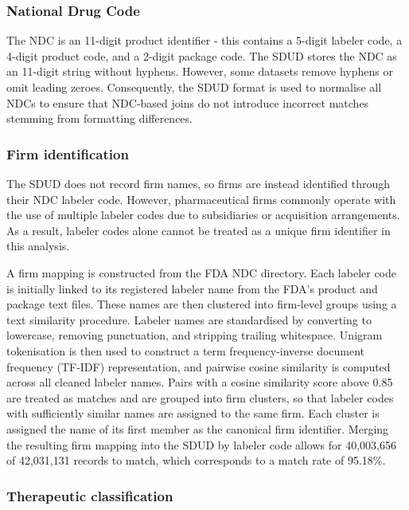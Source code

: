 \documentclass[12pt]{article}
\begin{document}
\subsubsection{National Drug Code}

The NDC is an 11-digit product identifier - this contains a 5-digit labeler code, a 4-digit product code, and a 2-digit package code. The SDUD stores the NDC as an 11-digit string without hyphens. However, some datasets remove hyphens or omit leading zeroes. Consequently, the SDUD format is used to normalise all NDCs to ensure that NDC-based joins do not introduce incorrect matches stemming from formatting differences. 

\subsubsection{Firm identification}

The SDUD does not record firm names, so firms are instead identified through their NDC labeler code. However, pharmaceutical firms commonly operate with the use of multiple labeler codes due to  subsidiaries or acquisition arrangements. As a result, labeler codes alone cannot be treated as a unique firm identifier in this analysis.

A firm mapping is constructed from the FDA NDC directory. Each labeler code is initially linked to its registered labeler name from the FDA's product and package text files. These names are then clustered into firm-level groups using a text similarity procedure. Labeler names are standardised by converting to lowercase, removing punctuation, and stripping trailing whitespace. Unigram tokenisation is then used to construct a term frequency-inverse document frequency (TF-IDF) representation, and pairwise cosine similarity is computed across all cleaned labeler names. Pairs with a cosine similarity score above 0.85 are treated as matches and are grouped into firm clusters, so that labeler codes with sufficiently similar names are assigned to the same firm. Each cluster is assigned the name of its first member as the canonical firm identifier. Merging the resulting firm mapping into the SDUD by labeler code allows for 40,003,656 of 42,031,131 records to match, which corresponds to a match rate of 95.18\%.

\subsubsection{Therapeutic classification}
\end{document}
